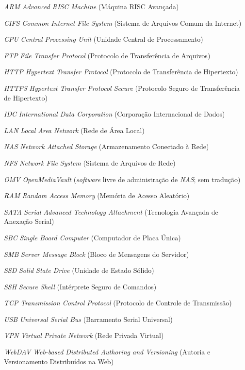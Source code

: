 
\begin{siglas}
    \item[\textit{ARM}]      \textit{Advanced RISC Machine} (Máquina RISC Avançada)
    \item[\textit{CIFS}]     \textit{Common Internet File System} (Sistema de Arquivos Comum da Internet)
    \item[\textit{CPU}]      \textit{Central Processing Unit} (Unidade Central de Processamento)
    \item[\textit{FTP}]      \textit{File Transfer Protocol} (Protocolo de Transferência de Arquivos)
    \item[\textit{HTTP}]     \textit{Hypertext Transfer Protocol} (Protocolo de Transferência de Hipertexto)
    \item[\textit{HTTPS}]    \textit{Hypertext Transfer Protocol Secure} (Protocolo Seguro de Transferência de Hipertexto)
    \item[\textit{IDC}]      \textit{International Data Corporation} (Corporação Internacional de Dados)
    \item[\textit{LAN}]      \textit{Local Area Network} (Rede de Área Local)
    \item[\textit{NAS}]      \textit{Network Attached Storage} (Armazenamento Conectado à Rede)
    \item[\textit{NFS}]      \textit{Network File System} (Sistema de Arquivos de Rede)
    \item[\textit{OMV}]      \textit{OpenMediaVault} (\textit{software} livre de administração de \textit{NAS}; sem tradução)
    \item[\textit{RAM}]      \textit{Random Access Memory} (Memória de Acesso Aleatório)
    \item[\textit{SATA}]     \textit{Serial Advanced Technology Attachment} (Tecnologia Avançada de Anexação Serial)
    \item[\textit{SBC}]      \textit{Single Board Computer} (Computador de Placa Única)
    \item[\textit{SMB}]      \textit{Server Message Block} (Bloco de Mensagens do Servidor)
    \item[\textit{SSD}]      \textit{Solid State Drive} (Unidade de Estado Sólido)
    \item[\textit{SSH}]      \textit{Secure Shell} (Intérprete Seguro de Comandos)
    \item[\textit{TCP}]      \textit{Transmission Control Protocol} (Protocolo de Controle de Transmissão)
    \item[\textit{USB}]      \textit{Universal Serial Bus} (Barramento Serial Universal)
    \item[\textit{VPN}]      \textit{Virtual Private Network} (Rede Privada Virtual)
    \item[\textit{WebDAV}]   \textit{Web-based Distributed Authoring and Versioning} (Autoria e Versionamento Distribuídos na Web)
\end{siglas}
